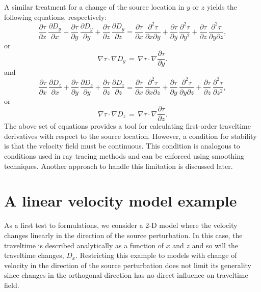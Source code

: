 A similar treatment for a change of the source location in $y$ or $z$ yields the following equations, respectively:
\begin{equation}
\frac{\partial \tau}{\partial x} \, \frac{\partial D_y}{\partial x} + 
\frac{\partial \tau}{\partial y} \, \frac{\partial D_y}{\partial y}+
\frac{\partial \tau}{\partial z} \, \frac{\partial D_y}{\partial z} = \frac{\partial \tau}{\partial x} \, \frac{\partial^2 \tau}{ \partial x \partial y}+ 
\frac{\partial \tau}{\partial y} \, \frac{\partial^2 \tau}{\partial y^2}+
\frac{\partial \tau}{\partial z} \, \frac{\partial^2 \tau}{\partial y \partial z},
\label{eq:eikdsyF}
\end{equation}
or
\begin{equation}
\nabla \tau \cdot \nabla D_y \, = \, \nabla \tau \cdot \nabla \frac{\partial \tau}{\partial y}.
\label{eq:eikdsFFy}
\end{equation}
and
\begin{equation}
\frac{\partial \tau}{\partial x} \, \frac{\partial D_z}{\partial x} + 
\frac{\partial \tau}{\partial y} \, \frac{\partial D_z}{\partial y}+
\frac{\partial \tau}{\partial z} \, \frac{\partial D_z}{\partial z} = \frac{\partial \tau}{\partial x} \, \frac{\partial^2 \tau}{\partial x \partial z}+ 
\frac{\partial \tau}{\partial y} \, \frac{\partial^2 \tau}{\partial y \partial z}+
\frac{\partial \tau}{\partial z} \, \frac{\partial^2 \tau}{\partial z^2},
\label{eq:eikdszF}
\end{equation}
or
\begin{equation}
\nabla \tau \cdot \nabla D_z \, = \, \nabla \tau \cdot \nabla \frac{\partial \tau}{\partial z}.
\label{eq:eikdsFFz}
\end{equation}
The above set of equations provides a tool for calculating first-order
traveltime derivatives with respect to the source location.  However,
a condition for stability is that the velocity field must be
continuous. This condition is analogous to conditions used in ray
tracing methods and can be enforced using smoothing
techniques. Another approach to handle this limitation is discussed
later.

\section{A linear velocity model example}

As a first test to   formulations, we consider a
2-D model where the velocity changes linearly in the direction of the
source perturbation. In this case, the traveltime is described
analytically as a function of $x$ and $z$ and so will the traveltime
changes, $D_x$. Restricting this example to models with change of
velocity in the direction of the source perturbation does not limit
its generality since changes in the orthogonal direction has no direct
influence on  traveltime field. 

